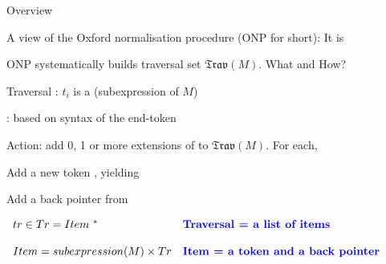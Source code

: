 \documentclass[12pt,fleqn,landscape]{article}
\begin{document}
\begin{slide}{Overview}



A view of the Oxford normalisation procedure (ONP for short): It is
\vair

\bc{}
\ec




\bi

\item ONP systematically builds  traversal set   $\mathfrak{Trav}(M)$. What and How?
\vair\vair

\item Traversal : \hfill {} \hair  $t_i$ is a  (subexpression  of $M$)
\vair\vair

\item  {}: based on syntax of the end-token 
\vair
\item Action: add  0, 1 or more extensions of  to  $\mathfrak{Trav}(M)$. For each,
\vair
\bi 
\item Add a new token , yielding 
\vair

\item Add a back pointer from  \hfill {}
\vair
 \ei


\ei


 \bigskip
 
$
\ba{ll}tr \in Tr =  Item\ ^* & \mbox{\bleu{Traversal = a list of items}}
 \\\\
 Item = subexpression(M) \times Tr & \mbox{\bleu{Item = a token and a back pointer}}

\ea$


\end{slide}


\end{document}
